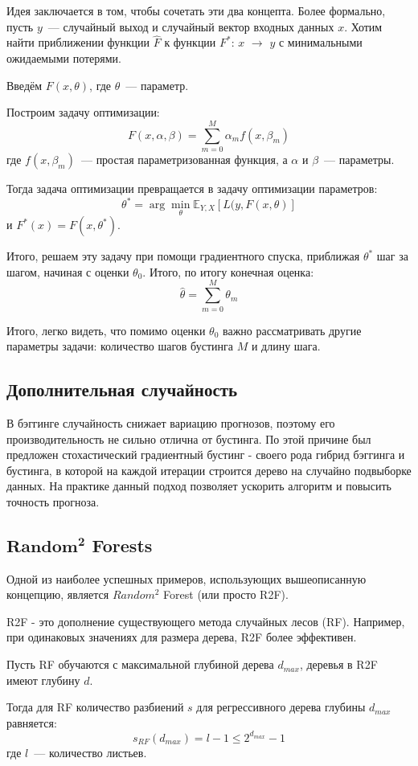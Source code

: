 Идея заключается в том, чтобы сочетать эти два концепта. Более формально, пусть $y$~--- случайный выход и случайный вектор входных данных $x$.
Хотим найти приближении функции $\hat{F}$ к функции $F^*$: $x$ $\rightarrow$ $y$ с минимальными ожидаемыми потерями.

Введём $F(x, \theta)$, где $\theta$~--- параметр.

Построим задачу оптимизации:
$$F(x, \alpha, \beta) = \sum_{m = 0}^M \alpha_m f(x, \beta_m)$$ где $f(x, \beta_m)$~--- простая параметризованная функция, а $\alpha$ и $\beta$~--- параметры.

Тогда задача оптимизации превращается в задачу оптимизации параметров:
$$\theta^* = \arg \min_{\theta} \mathbb{E}_{Y, X} [L(y, F(x, \theta)]$$
и $F^*(x)=F(x, \theta^*)$.

Итого, решаем эту задачу при помощи градиентного спуска, приближая $\theta^*$ шаг за шагом, начиная с оценки $\theta_0$. Итого, по итогу конечная оценка:
$$\hat{\theta} = \sum_{m=0}^M \theta_m$$

Итого, легко видеть, что помимо оценки $\theta_0$ важно рассматривать другие параметры задачи: количество шагов бустинга $M$ и длину шага.

\subsection*{Дополнительная случайность}
В бэггинге случайность снижает вариацию прогнозов, поэтому его производительность не сильно отлична от бустинга. По этой причине был предложен стохастический градиентный бустинг - своего рода гибрид бэггинга и бустинга, в которой на каждой итерации строится дерево на случайно подвыборке данных. На практике данный подход позволяет ускорить алгоритм и повысить точность прогноза.

\subsection*{$\mathbf{Random^2}$ Forests}
Одной из наиболее успешных примеров, использующих вышеописанную концепцию, является $Random^2$ Forest (или просто R2F).

R2F - это дополнение существующего метода случайных лесов (RF). Например, при одинаковых значениях для размера дерева, R2F более эффективен.

Пусть RF обучаются с максимальной глубиной дерева $d_{max}$, деревья в R2F имеют глубину $d$.

Тогда для RF количество разбиений $s$ для регрессивного дерева глубины $d_{max}$ равняется:
$$s_{RF}(d_{max})=l - 1 \leq 2^{d_{max}} - 1$$
где $l$~--- количество листьев.

